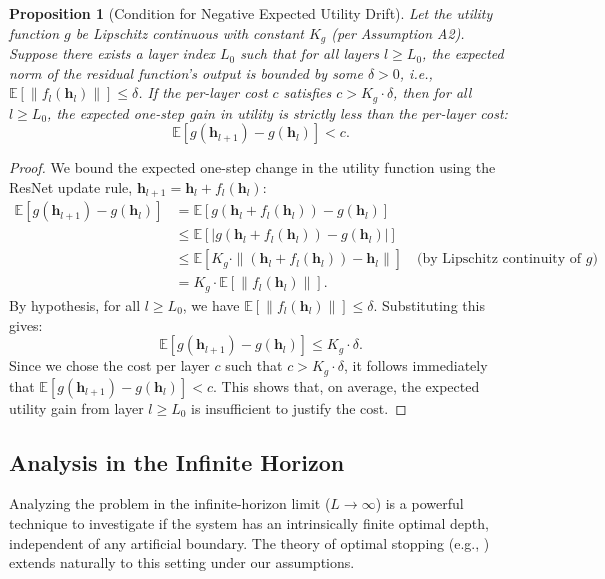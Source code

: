 \documentclass[12pt]{imsart}
\newcommand{\E}{\mathbb{E}}
\newcommand{\h}{\mathbf{h}}
\theoremstyle{plain}
\newtheorem{proposition}[theorem]{Proposition}
\theoremstyle{definition}
\begin{document}
\begin{proposition}[Condition for Negative Expected Utility Drift] \label{prop:diminishing_returns}
Let the utility function $g$ be Lipschitz continuous with constant $K_g$ (per Assumption A2). Suppose there exists a layer index $L_0$ such that for all layers $l \ge L_0$, the expected norm of the residual function's output is bounded by some $\delta > 0$, i.e., $\E[\|f_l(\h_l)\|] \le \delta$. If the per-layer cost $c$ satisfies $c > K_g \cdot \delta$, then for all $l \ge L_0$, the expected one-step gain in utility is strictly less than the per-layer cost:
\begin{equation}
\E[g(\h_{l+1}) - g(\h_l)] < c.
\end{equation}
\end{proposition}
\begin{proof}
We bound the expected one-step change in the utility function using the ResNet update rule, $\h_{l+1} = \h_l + f_l(\h_l)$:
\begin{align*}
\E[g(\h_{l+1}) - g(\h_l)] &= \E[g(\h_l + f_l(\h_l)) - g(\h_l)] \\
&\le \E\left[ \left| g(\h_l + f_l(\h_l)) - g(\h_l) \right| \right] \\
&\le \E[K_g \cdot \|(\h_l + f_l(\h_l)) - \h_l\|] \quad \text{(by Lipschitz continuity of } g\text{)} \\
&= K_g \cdot \E[\|f_l(\h_l)\|].
\end{align*}
By hypothesis, for all $l \ge L_0$, we have $\E[\|f_l(\h_l)\|] \le \delta$. Substituting this gives:
\[ \E[g(\h_{l+1}) - g(\h_l)] \le K_g \cdot \delta. \]
Since we chose the cost per layer $c$ such that $c > K_g \cdot \delta$, it follows immediately that
$\E[g(\h_{l+1}) - g(\h_l)] < c$. This shows that, on average, the expected utility gain from layer $l \ge L_0$ is insufficient to justify the cost.
\end{proof}

\subsection{Analysis in the Infinite Horizon}
Analyzing the problem in the infinite-horizon limit ($L \to \infty$) is a powerful technique to investigate if the system has an intrinsically finite optimal depth, independent of any artificial boundary. The theory of optimal stopping (e.g., \cite{Peskir2006}) extends naturally to this setting under our assumptions.
\end{document}
